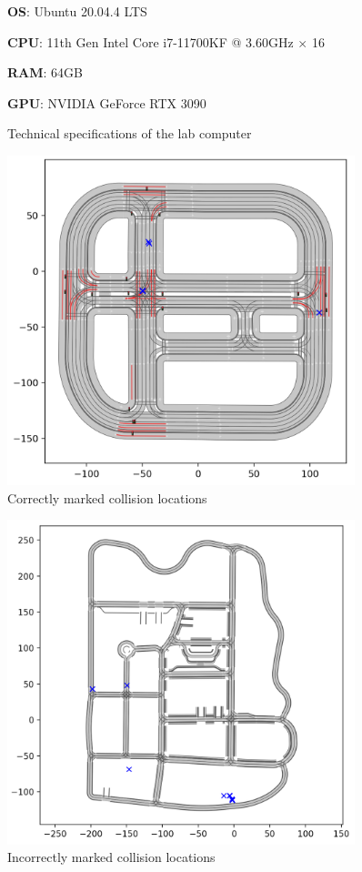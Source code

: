 \begin{figure} [h]
    \centering
    \textbf{OS}: Ubuntu 20.04.4 LTS
    
    \textbf{CPU}: 11th Gen Intel Core i7-11700KF @ 3.60GHz $\times$ 16
    
    \textbf{RAM}: 64GB
    
    \textbf{GPU}: NVIDIA GeForce RTX 3090
    \caption{Technical specifications of the lab computer}
    \label{specs}
\end{figure}

\begin{figure}
    \centering
    \includegraphics[width = 0.9\textwidth]{research_paper/Images/correctly_marked.png}
    \caption{Correctly marked collision locations}
    \label{fig:correctly_marked}
\end{figure}

\begin{figure}
    \centering
    \includegraphics[width = 0.9\textwidth]{research_paper/Images/incorrectly_marked.png}
    \caption{Incorrectly marked collision locations}
    \label{fig:incorrectly_marked}
\end{figure}